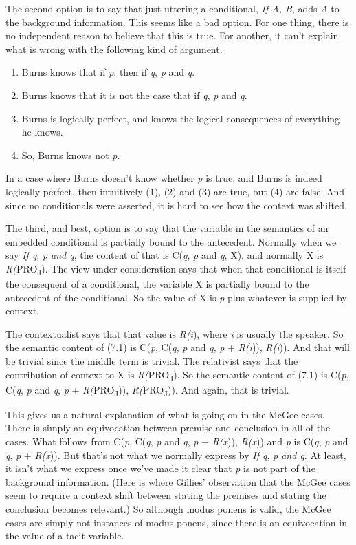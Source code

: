 \documentclass[
  11pt,
  letterpaper,
  DIV=11,
  numbers=noendperiod,
  oneside]{scrartcl}
\providecommand{\tightlist}{%
  \setlength{\itemsep}{0pt}\setlength{\parskip}{0pt}}\usepackage{longtable,booktabs,array}
\begin{document}
The second option is to say that just uttering a conditional, \emph{If
A, B}, adds \emph{A} to the background information. This seems like a
bad option. For one thing, there is no independent reason to believe
that this is true. For another, it can't explain what is wrong with the
following kind of argument.

\begin{enumerate}
\def\labelenumi{\arabic{enumi}.}
\tightlist
\item
  Burns knows that if \emph{p}, then if \emph{q}, \emph{p} and \emph{q}.
\item
  Burns knows that it is not the case that if \emph{q}, \emph{p} and
  \emph{q}.
\item
  Burns is logically perfect, and knows the logical consequences of
  everything he knows.
\item
  So, Burns knows not \emph{p}.
\end{enumerate}

In a case where Burns doesn't know whether \emph{p} is true, and Burns
is indeed logically perfect, then intuitively (1), (2) and (3) are true,
but (4) are false. And since no conditionals were asserted, it is hard
to see how the context was shifted.

The third, and best, option is to say that the variable in the semantics
of an embedded conditional is partially bound to the antecedent.
Normally when we say \emph{If q}, \emph{p and q}, the content of that is
C(\emph{q}, \emph{p} and \emph{q}, X), and normally X is
\emph{R(}PRO\textsubscript{J}). The view under consideration says that
when that conditional is itself the consequent of a conditional, the
variable X is partially bound to the antecedent of the conditional. So
the value of X is \emph{p} plus whatever is supplied by context.

The contextualist says that that value is \emph{R(i}), where \emph{i} is
usually the speaker. So the semantic content of (7.1) is C(\emph{p},
C(\emph{q}, \emph{p} and \emph{q}, \emph{p} + \emph{R(i})),
\emph{R(i})). And that will be trivial since the middle term is trivial.
The relativist says that the contribution of context to X is
\emph{R(}PRO\textsubscript{J}). So the semantic content of (7.1) is
C(\emph{p}, C(\emph{q}, \emph{p} and \emph{q}, \emph{p} +
\emph{R(}PRO\textsubscript{J})), \emph{R(}PRO\textsubscript{J})). And
again, that is trivial.

This gives us a natural explanation of what is going on in the McGee
cases. There is simply an equivocation between premise and conclusion in
all of the cases. What follows from C(\emph{p}, C(\emph{q}, \emph{p} and
\emph{q}, \emph{p} + \emph{R(x})), \emph{R(x})) and \emph{p} is
C(\emph{q}, \emph{p} and \emph{q}, \emph{p} + \emph{R(x})). But that's
not what we normally express by \emph{If q}, \emph{p and q}. At least,
it isn't what we express once we've made it clear that \emph{p} is not
part of the background information. (Here is where Gillies' observation
that the McGee cases seem to require a context shift between stating the
premises and stating the conclusion becomes relevant.) So although modus
ponens is valid, the McGee cases are simply not instances of modus
ponens, since there is an equivocation in the value of a tacit variable.
\end{document}
